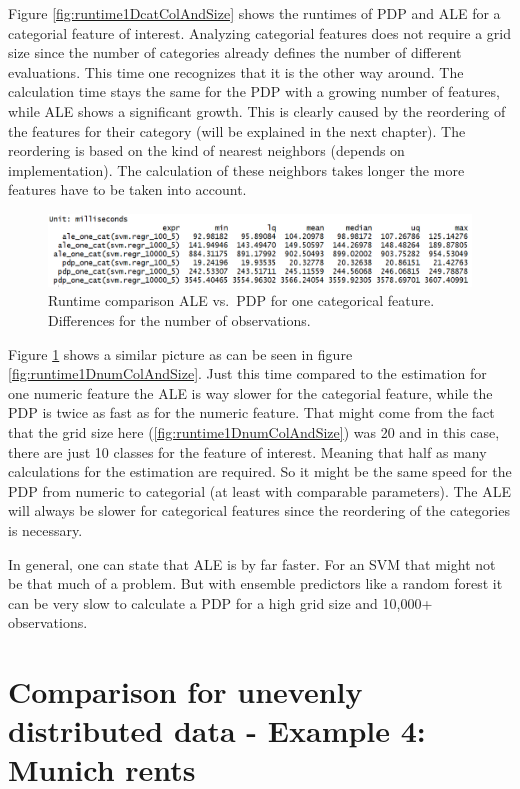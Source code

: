 \documentclass[]{krantz}
\begin{document}
Figure \ref{fig:runtime1DcatColAndSize} shows the runtimes of PDP and
ALE for a categorial feature of interest. Analyzing categorial features
does not require a grid size since the number of categories already
defines the number of different evaluations. This time one recognizes
that it is the other way around. The calculation time stays the same for
the PDP with a growing number of features, while ALE shows a significant
growth. This is clearly caused by the reordering of the features for
their category (will be explained in the next chapter). The reordering
is based on the kind of nearest neighbors (depends on implementation).
The calculation of these neighbors takes longer the more features have
to be taken into account.

\begin{figure}
\includegraphics[width=1\linewidth]{images/ale_1_one_cat_nrows} \caption{Runtime comparison ALE vs.~PDP for one
categorical feature. Differences for the number of observations.}\label{fig:runtime1DcatNrow}
\end{figure}




Figure \ref{fig:runtime1DcatNrow} shows a similar picture as can be seen
in figure \ref{fig:runtime1DnumColAndSize}. Just this time compared to
the estimation for one numeric feature the ALE is way slower for the
categorial feature, while the PDP is twice as fast as for the numeric
feature. That might come from the fact that the grid size here
(\ref{fig:runtime1DnumColAndSize}) was 20 and in this case, there are
just 10 classes for the feature of interest. Meaning that half as many
calculations for the estimation are required. So it might be the same
speed for the PDP from numeric to categorial (at least with comparable
parameters). The ALE will always be slower for categorical features
since the reordering of the categories is necessary.

In general, one can state that ALE is by far faster. For an SVM that
might not be that much of a problem. But with ensemble predictors like a
random forest it can be very slow to calculate a PDP for a high grid
size and 10,000+ observations.

\section{Comparison for unevenly distributed data - Example 4: Munich
rents}\label{comparison-for-unevenly-distributed-data---example-4-munich-rents}
\end{document}
